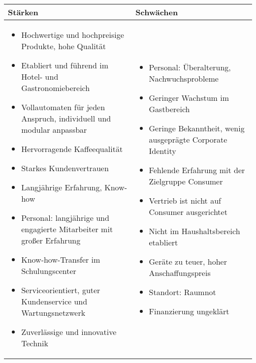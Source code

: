 {{\begin{table}[h!]
\centering
\begin{tabular}{|p{7.5cm}|p{7.5cm}|}
\hline
\textbf{Stärken} & \textbf{Schwächen} \\ \hline
\begin{itemize}
    \item Hochwertige und hochpreisige Produkte, hohe Qualität
    \item Etabliert und führend im Hotel- und Gastronomiebereich
    \item Vollautomaten für jeden Anspruch, individuell und modular anpassbar
    \item Hervorragende Kaffeequalität
    \item Starkes Kundenvertrauen
    \item Langjährige Erfahrung, Know-how
    \item Personal: langjährige und engagierte Mitarbeiter mit großer Erfahrung
    \item Know-how-Transfer im Schulungscenter
    \item Serviceorientiert, guter Kundenservice und Wartungsnetzwerk
    \item Zuverlässige und innovative Technik
\end{itemize} & 
\begin{itemize}
    \item Personal: Überalterung, Nachwuchsprobleme
    \item Geringer Wachstum im Gastbereich
    \item Geringe Bekanntheit, wenig ausgeprägte Corporate Identity
    \item Fehlende Erfahrung mit der Zielgruppe Consumer
    \item Vertrieb ist nicht auf Consumer ausgerichtet
    \item Nicht im Haushaltsbereich etabliert
    \item Geräte zu teuer, hoher Anschaffungspreis
    \item Standort: Raumnot
    \item Finanzierung ungeklärt
\end{itemize} \\ \hline


\end{tabular}
\end{table}}}
